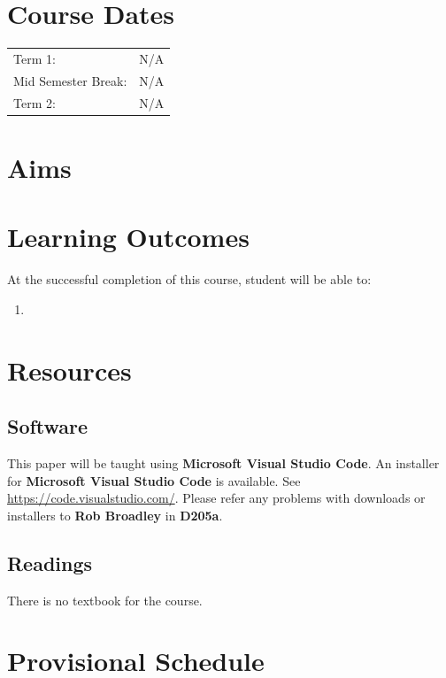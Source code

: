 \documentclass{article}
\begin{document}
\section*{Course Dates}
\begin{tabular}{ll}
	Term 1:             & N/A \\
	Mid Semester Break: & N/A \\
	Term 2:             & N/A \\
\end{tabular}

\section*{Aims}

\section*{Learning Outcomes}
At the successful completion of this course, student will be able to:
\begin{enumerate}
	\item 
\end{enumerate}

\section*{Resources}

\subsection*{Software}
This paper will be taught using \textbf{Microsoft Visual Studio Code}. An installer for \textbf{Microsoft Visual Studio Code} is available. See \href{https://code.visualstudio.com/}{https://code.visualstudio.com/}. Please refer any problems with downloads or installers to \textbf{Rob Broadley} in \textbf{D205a}.

\subsection*{Readings}
There is no textbook for the course.

\section*{Provisional Schedule}
\end{document}
